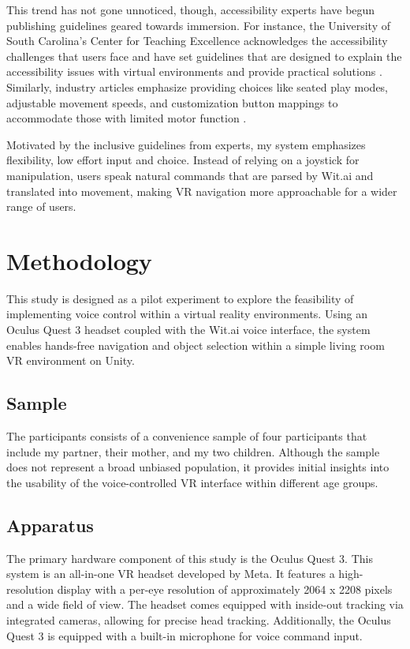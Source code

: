 \documentclass[manuscript, screen, review]{acmart}
\begin{document}
This trend has not gone unnoticed, though, accessibility experts have begun publishing guidelines geared towards immersion. For instance, the University of South Carolina's Center for Teaching Excellence acknowledges the accessibility challenges that users face and have set guidelines that are designed to explain the accessibility issues with virtual environments and provide practical solutions \cite{b1}. Similarly, industry articles emphasize providing choices like seated play modes, adjustable movement speeds, and customization button mappings to accommodate those with limited motor function \cite{a6}.

Motivated by the inclusive guidelines from experts, my system emphasizes flexibility, low effort input and choice. Instead of relying on a joystick for manipulation, users speak natural commands that are parsed by Wit.ai and translated into movement, making VR navigation more approachable for a wider range of users. 

 \section{Methodology}
This study is designed as a pilot experiment to explore the feasibility of implementing voice control within a virtual reality environments. Using an Oculus Quest 3 headset coupled with the Wit.ai voice interface, the system enables hands-free navigation and object selection within a simple living room VR environment on Unity. 
 
 \subsection{Sample}
The participants consists of a convenience sample of four participants that include my partner, their mother, and my two children. Although the sample does not represent a broad unbiased population, it provides initial insights into the usability of the voice-controlled VR interface within different age groups.  


\subsection{Apparatus}
The primary hardware component of this study is the Oculus Quest 3. This system is an all-in-one VR headset developed by Meta. It features a high-resolution display with a per-eye resolution of approximately 2064 x 2208 pixels and a wide field of view. The headset comes equipped with inside-out tracking via integrated cameras, allowing for precise head tracking. Additionally, the Oculus Quest 3 is equipped with a built-in microphone for voice command input. 
\end{document}
